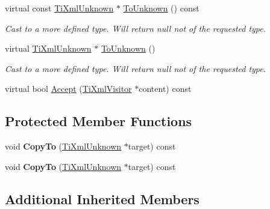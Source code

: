 \begin{DoxyCompactItemize}
\item 
\hypertarget{class_ti_xml_unknown_ab0313e5fe77987d746ac1a97a254419d}{virtual const \hyperlink{class_ti_xml_unknown}{Ti\+Xml\+Unknown} $\ast$ \hyperlink{class_ti_xml_unknown_ab0313e5fe77987d746ac1a97a254419d}{To\+Unknown} () const }\label{class_ti_xml_unknown_ab0313e5fe77987d746ac1a97a254419d}

\begin{DoxyCompactList}\small\item\em Cast to a more defined type. Will return null not of the requested type. \end{DoxyCompactList}\item 
\hypertarget{class_ti_xml_unknown_a67c9fd22940e8c47f706a72cdd2e332c}{virtual \hyperlink{class_ti_xml_unknown}{Ti\+Xml\+Unknown} $\ast$ \hyperlink{class_ti_xml_unknown_a67c9fd22940e8c47f706a72cdd2e332c}{To\+Unknown} ()}\label{class_ti_xml_unknown_a67c9fd22940e8c47f706a72cdd2e332c}

\begin{DoxyCompactList}\small\item\em Cast to a more defined type. Will return null not of the requested type. \end{DoxyCompactList}\item 
virtual bool \hyperlink{class_ti_xml_unknown_ad7122e5135581b3c832a1a3217760a93}{Accept} (\hyperlink{class_ti_xml_visitor}{Ti\+Xml\+Visitor} $\ast$content) const 
\end{DoxyCompactItemize}
\subsection*{Protected Member Functions}
\begin{DoxyCompactItemize}
\item 
\hypertarget{class_ti_xml_unknown_a08ca7b225a2bcb604d3c72e199d33408}{void {\bfseries Copy\+To} (\hyperlink{class_ti_xml_unknown}{Ti\+Xml\+Unknown} $\ast$target) const }\label{class_ti_xml_unknown_a08ca7b225a2bcb604d3c72e199d33408}

\item 
\hypertarget{class_ti_xml_unknown_a08ca7b225a2bcb604d3c72e199d33408}{void {\bfseries Copy\+To} (\hyperlink{class_ti_xml_unknown}{Ti\+Xml\+Unknown} $\ast$target) const }\label{class_ti_xml_unknown_a08ca7b225a2bcb604d3c72e199d33408}

\end{DoxyCompactItemize}
\subsection*{Additional Inherited Members}



